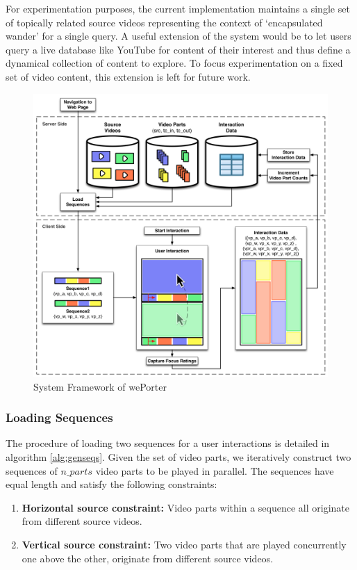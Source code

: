 For experimentation purposes, the current implementation maintains a single set of topically related source videos representing the context of `encapsulated wander' for a single query. A useful extension of the system would be to let users query a live database like YouTube for content of their interest and thus define a dynamical collection of content to explore. To focus experimentation on a fixed set of video content, this extension is left for future work. 

\begin{figure}[htbp]
  \centering
    \includegraphics[width=\textwidth]{img/framework}
  \caption{System Framework of wePorter}
  \label{fig:framework}
\end{figure}

\subsubsection{Loading Sequences}
The procedure of loading two sequences for a user interactions is detailed in algorithm \ref{alg:genseqs}. Given the set of video parts, we iteratively construct two sequences of $n\_parts$ video parts to be played in parallel. The sequences have equal length and satisfy the following constraints:

\begin{enumerate}
  \item \textbf{Horizontal source constraint:} Video parts within a sequence all originate from different source videos.
  \item \textbf{Vertical source constraint:} Two video parts that are played concurrently one above the other, originate from different source videos.
\end{enumerate}

